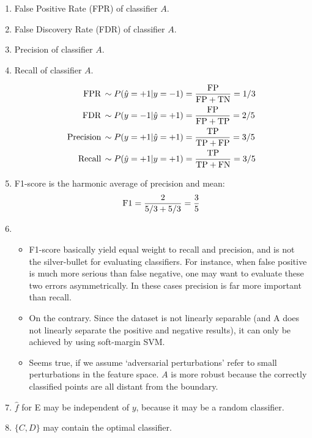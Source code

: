\documentclass[a4paper, 10pt]{article}
\newcommand{\annot}[1]{{\rm #1}}
\begin{document}
\begin{enumerate}[label=(\alph*)]
    \item False Positive Rate (FPR) of classifier $A$.
    \item False Discovery Rate (FDR) of classifier $A$.
    \item Precision of classifier $A$.
    \item Recall of classifier $A$.
    
    \begin{equation}
        \begin{aligned}
            \annot{FPR} \, &\sim P(\hat{y}=+1|y=-1) = \frac{\annot{FP}}{\annot{FP + TN}} = 1/3 \\
            \annot{FDR} \, &\sim P(y=-1|\hat{y}=+1) = \frac{\annot{FP}}{\annot{FP + TP}} = 2/5\\
            \annot{Precision} \, &\sim P(y=+1|\hat{y}=+1) = \frac{\annot{TP}}{\annot{TP + FP}} = 3/5\\
            \annot{Recall} \, &\sim P(\hat{y}=+1|y=+1) = \frac{\annot{TP}}{\annot{TP + FN}} = 3/5\\
        \end{aligned}
    \end{equation}
    
    \item F1-score is the harmonic average of precision and mean:
    \begin{equation}
        \annot{F1} = \frac{2}{5/3 + 5/3} = \frac{3}{5}
    \end{equation}
    
    \item 
    \begin{itemize}
        \item F1-score basically yield equal weight to recall and precision, and is not the silver-bullet for evaluating classifiers. For instance, when false positive is much more serious than false negative, one may want to evaluate these two errors asymmetrically. In these cases precision is far more important than recall.
        \item On the contrary. Since the dataset is not linearly separable (and A does not linearly separate the positive and negative results), it can only be achieved by using soft-margin SVM.
        \item Seems true, if we assume `adversarial perturbations' refer to small perturbations in the feature space. $A$ is more robust because the correctly classified points are all distant from the boundary.
    \end{itemize}
    
    \item $\hat{f}$ for E may be independent of $y$, because it may be a random classifier.
    \item $\{C,D\}$ may contain the optimal classifier.
\end{enumerate}
\end{document}
